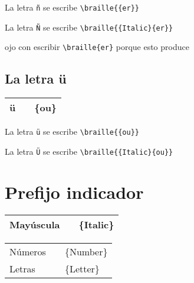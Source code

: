 \documentclass[draft]{article}
\newcommand{\mytildetable}[1]{%
	\enskip\begin{tabular}[t]{l|r|l} 
		\hline #1 \hline
	\end{tabular}\enskip}
\begin{document}
La letra \texttt{ñ} se escribe \verb|\braille{{er}}|


La letra \texttt{Ñ} se escribe \verb|\braille{{Italic}{er}}|


ojo con escribir  \verb|\braille{er}| porque esto produce


%
%
%
%
%
%
%
%



\subsection{La letra ü}

\begin{center}
	\mytildetable{
		ü & \braille{{ou}}     & \{ou\} \\
	}
\end{center}

La letra \texttt{ü} se escribe \verb|\braille{{ou}}|


La letra \texttt{Ü} se escribe \verb|\braille{{Italic}{ou}}|



\section{Prefijo indicador}

\begin{center}
	\mytildetable{
		Mayúscula&\braille{{Italic}}  & \{Italic\}   \\
	}
	\mytildetable{
		Números &\braille{{Number}} & \{Number\} \\	
		Letras  &\braille{{Letter}} & \{Letter\} \\
	}
\end{center}
\end{document}
